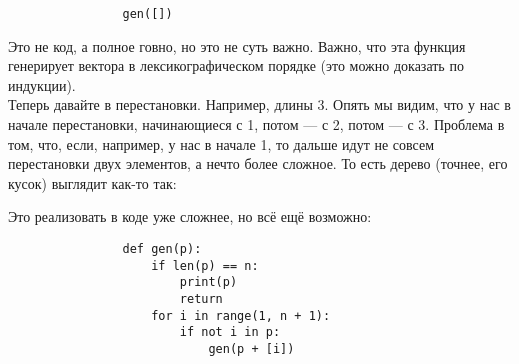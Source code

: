 \documentclass{article}
\begin{document}
\begin{itemize}
\begin{Comment}
\begin{verbatim}
                gen([])
            \end{verbatim}
            Это не код, а полное говно, но это не суть важно. Важно, что эта функция генерирует вектора в лексикографическом порядке (это можно доказать по индукции).\\
            Теперь давайте в перестановки. Например, длины 3. Опять мы видим, что у нас в начале перестановки, начинающиеся с 1, потом --- с 2, потом --- с 3. Проблема в том, что, если, например, у нас в начале 1, то дальше идут не совсем перестановки двух элементов, а нечто более сложное. То есть дерево (точнее, его кусок) выглядит как-то так:
            \begin{center}
            \end{center}
            Это реализовать в коде уже сложнее, но всё ещё возможно:
            \begin{verbatim}
                def gen(p):
                    if len(p) == n:
                        print(p)
                        return
                    for i in range(1, n + 1):
                        if not i in p:
                            gen(p + [i])
                

\end{verbatim}
\end{Comment}
\end{itemize}
\end{document}
